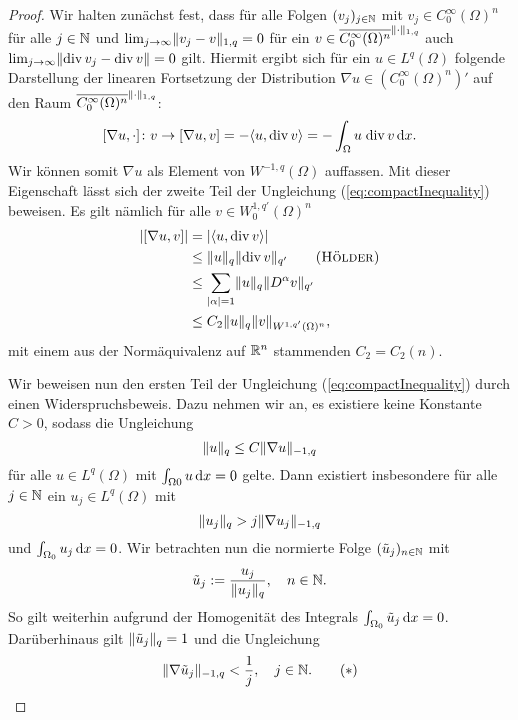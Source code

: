 \begin{proof}
  Wir halten zunächst fest, dass für alle Folgen $(v_j)_{j \in \mathbb{N}}$ mit $v_j \in C_0^\infty(\Omega)^n$ für alle $j \in \mathbb{N}$ und $\lim_{j \to \infty} \lVert v_j - v \rVert_{1,q} = 0$ für ein $v \in \overline{C_0^\infty(\Omega)^n}^{\lVert \cdot \rVert_{1,q}}$ auch $\lim_{j \to \infty} \lVert \mathrm{div\,} v_j - \mathrm{div\,} v \rVert = 0$ gilt.  
  Hiermit ergibt sich für ein $u \in L^q(\Omega)$ folgende Darstellung der linearen Fortsetzung der Distribution $\nabla u \in (C_0^\infty(\Omega)^n)'$ auf den Raum $\overline{C_0^\infty(\Omega)^n}^{\lVert \cdot \rVert_{1,q}}$:
  $$
    [\nabla u, \cdot] \colon v \to [\nabla u, v] 
    = - \langle u, \mathrm{div\,} v \rangle 
    = - \int_{\Omega} u\; \mathrm{div\,} v \, {\operatorname{d}\!{x}}.
  $$
  Wir können somit $\nabla u$ als Element von $W^{-1,q}(\Omega)$ auffassen.
  Mit dieser Eigenschaft lässt sich der zweite Teil der Ungleichung (\ref{eq:compactInequality}) beweisen. 
  Es gilt nämlich für alle $v \in W_0^{1,q'}(\Omega)^n$
  \begin{align*}
    |[\nabla u, v]|
    &= | \langle u, \div v \rangle| \\
    &\leq \norm{u}_q \norm{\div v}_{q'} \tag{\hoelder}\\
    &\leq \sum_{|\alpha| = 1} \norm{u}_q \norm{D^\alpha v}_{q'} \\
    &\leq C_2 \norm{u}_q \norm{v}_{W^{1,q'}(\Omega)^n},
  \end{align*}
  mit einem aus der Normäquivalenz auf $\mathbb{R}^n$ stammenden $C_2 = C_2(n)$.

  Wir beweisen nun den ersten Teil der Ungleichung (\ref{eq:compactInequality}) durch einen Widerspruchsbeweis.
  Dazu nehmen wir an, es existiere keine Konstante $C > 0$, sodass die Ungleichung
  $$
  \lVert u \rVert_q \leq C \lVert \nabla u \rVert_{-1,q}
  $$
  für alle $u \in L^q(\Omega)$ mit $\int_{\Omega0} u \, {\operatorname{d}\!{x}} = 0$ gelte.
  Dann existiert insbesondere für alle $j \in \mathbb{N}$ ein $u_j \in L^q(\Omega)$ mit
  $$
  \lVert u_j \rVert_q > j \lVert \nabla u_j \rVert_{-1,q}
  $$
  und $\int_{\Omega_0} u_j \, {\operatorname{d}\!{x}} = 0$.
  Wir betrachten nun die normierte Folge $(\tilde u_j)_{n \in \mathbb{N}}$ mit 
  $$
  \tilde u_j := \frac{u_j}{\lVert u_j \rVert_{q}}, \quad n \in \mathbb{N}.
  $$
  So gilt weiterhin aufgrund der Homogenität des Integrals $\int_{\Omega_0} \tilde u_j \, {\operatorname{d}\!{x}} = 0$. 
  Darüberhinaus gilt $\lVert \tilde u_j \rVert_q = 1$ und die Ungleichung 
  \begin{displaymath}
    \lVert \nabla \tilde u_j \rVert_{-1,q} < \frac{1}{j}, \quad j \in \mathbb{N}. \tag{$\ast$}
  \end{displaymath}


\end{proof}
